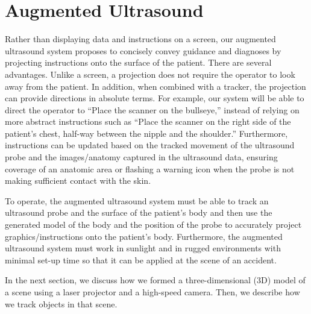 \documentclass{llncs}
\begin{document}
\section{Augmented Ultrasound}
Rather than displaying data and instructions on a screen, our augmented ultrasound system proposes to concisely convey guidance and diagnoses by projecting instructions onto the surface of the patient. There are several advantages. Unlike a screen, a projection does not require the operator to look away from the patient. In addition, when combined with a tracker, the projection can provide directions in absolute terms. For example, our system will be able to direct the operator to “Place the scanner on the bullseye,” instead of relying on more abstract instructions such as “Place the scanner on the right side of the patient’s chest, half-way between the nipple and the shoulder.” Furthermore, instructions can be updated based on the tracked movement of the ultrasound probe and the images/anatomy captured in the ultrasound data, ensuring coverage of an anatomic area or flashing a warning icon when the probe is not making sufficient contact with the skin.

To operate, the augmented ultrasound system must be able to track an ultrasound probe and the surface of the patient’s body and then use the generated model of the body and the position of the probe to accurately project graphics/instructions onto the patient’s body.  Furthermore, the augmented ultrasound system must work in sunlight and in rugged environments with minimal set-up time so that it can be applied at the scene of an accident.  

In the next section, we discuss how we formed a three-dimensional (3D) model of a scene using a laser projector and a high-speed camera. Then, we describe how we track objects in that scene.
\end{document}
